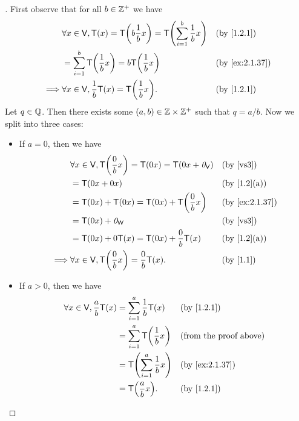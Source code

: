 \begin{proof}[]
	First observe that for all \(b \in \mathbb{Z}^+\) we have
	\begin{align*}
		         & \forall x \in \V, \T(x) = \T\pa{b \frac{1}{b} x} = \T\pa{\sum_{i = 1}^b \frac{1}{b} x} &  & \by{1.2.1}     \\
		         & = \sum_{i = 1}^b \T\pa{\frac{1}{b} x} = b \T\pa{\frac{1}{b} x}                         &  & \by{ex:2.1.37} \\
		\implies & \forall x \in \V, \frac{1}{b} \T(x) = \T\pa{\frac{1}{b} x}.                            &  & \by{1.2.1}
	\end{align*}
	Let \(q \in \mathbb{Q}\).
	Then there exists some \((a, b) \in \mathbb{Z} \times \mathbb{Z}^+\) such that \(q = a / b\).
	Now we split into three cases:
	\begin{itemize}
		\item If \(a = 0\), then we have
		      \begin{align*}
			               & \forall x \in \V, \T\pa{\frac{0}{b} x} = \T(0x) = \T(0x + \zv_{\V}) &  & \text{(by \ref{vs3})} \\
			               & = \T(0x + 0x)                                                       &  & \by{1.2}[a]           \\
			               & = \T(0x) + \T(0x) = \T(0x) + \T\pa{\frac{0}{b} x}                   &  & \by{ex:2.1.37}        \\
			               & = \T(0x) + \zv_{\W}                                                 &  & \text{(by \ref{vs3})} \\
			               & = \T(0x) + 0 \T(x) = \T(0x) + \frac{0}{b} \T(x)                     &  & \by{1.2}[a]           \\
			      \implies & \forall x \in \V, \T\pa{\frac{0}{b}x} = \frac{0}{b} \T(x).          &  & \by{1.1}
		      \end{align*}
		\item If \(a > 0\), then we have
		      \begin{align*}
			      \forall x \in \V, \frac{a}{b} \T(x) & = \sum_{i = 1}^a \frac{1}{b} \T(x)    &  & \by{1.2.1}                    \\
			                                          & = \sum_{i = 1}^a \T\pa{\frac{1}{b} x} &  & \text{(from the proof above)} \\
			                                          & = \T\pa{\sum_{i = 1}^a \frac{1}{b} x} &  & \by{ex:2.1.37}                \\
			                                          & = \T\pa{\frac{a}{b} x}.               &  & \by{1.2.1}

\end{align*}
\end{itemize}
\end{proof}
